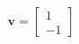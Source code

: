 \documentclass[preview]{standalone}
\begin{document}
\begin{align*}
\mathbf{v}=\begin{bmatrix} 1 \\ -1 \end{bmatrix}
\end{align*}
\end{document}
